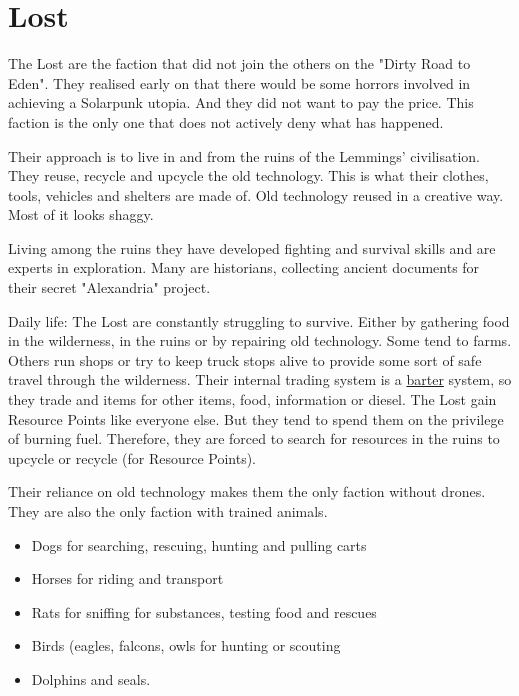 \section{Lost}
\label{sec:Lost}

The Lost are the faction that did not join the others on the "Dirty Road to Eden". They realised early on that there would be some horrors involved in achieving a Solarpunk utopia. And they did not want to pay the price. This faction is the only one that does not actively deny what has happened.

Their approach is to live in and from the ruins of the Lemmings' civilisation. They reuse, recycle and upcycle the old technology. This is what their clothes, tools, vehicles and shelters are made of. Old technology reused in a creative way. Most of it looks shaggy.

Living among the ruins they have developed fighting and survival skills and are experts in exploration.
Many are historians, collecting ancient documents for their secret "Alexandria" project.

Daily life: The Lost are constantly struggling to survive. Either by gathering food in the wilderness, in the ruins or by repairing old technology. Some tend to farms. Others run shops or try to keep truck stops alive to provide some sort of safe travel through the wilderness. Their internal trading system is a \hyperref[sec:Barter]{barter} system, so they trade and items for other items, food, information or diesel.
The Lost gain Resource Points like everyone else. But they tend to spend them on the privilege of burning fuel. Therefore, they are forced to search for resources in the ruins to upcycle or recycle (for Resource Points).

Their reliance on old technology makes them the only faction without drones. They are also the only faction with trained animals.

\begin{itemize}
    \item Dogs for searching, rescuing, hunting and pulling carts
    \item Horses for riding and transport
    \item Rats for sniffing for substances, testing food and rescues
    \item Birds (eagles, falcons, owls for hunting or scouting
    \item Dolphins and seals.
\end{itemize}

